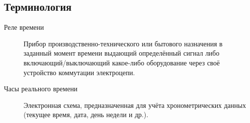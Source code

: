 \subsection{Терминология}
\begin{description}


\item[Реле времени]

Прибор производственно-технического или бытового назначения в заданный момент времени выдающий определённый сигнал либо включающий/выключающий какое-либо оборудование через своё устройство коммутации электроцепи. 

\item[Часы реального времени]

Электронная схема, предназначенная для учёта хронометрических данных (текущее время, дата, день недели и др.).


\end{description}

